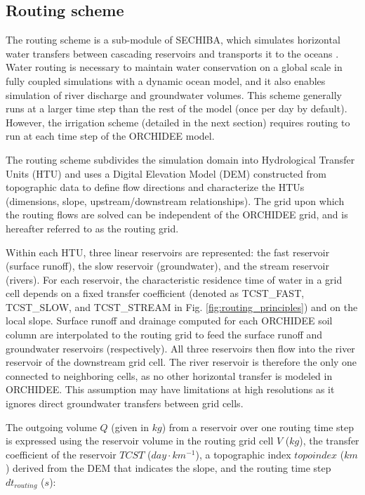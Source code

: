 
\subsection{Routing scheme}
The routing scheme is a sub-module of SECHIBA, which simulates horizontal water transfers between cascading reservoirs and transports it to the oceans \citep{ducharne_development_2003, ngo-duc_validation_2007}. 
Water routing is necessary to maintain water conservation on a global scale in fully coupled simulations with a dynamic ocean model, and it also enables simulation of river discharge and groundwater volumes. 
This scheme generally runs at a larger time step than the rest of the model (once per day by default). However, the irrigation scheme (detailed in the next section) requires routing to run at each time step of the ORCHIDEE model.

The routing scheme subdivides the simulation domain into Hydrological Transfer Units (HTU) and uses a Digital Elevation Model (DEM) constructed from topographic data to define flow directions and characterize the HTUs (dimensions, slope, upstream/downstream relationships). The grid upon which the routing flows are solved can be independent of the ORCHIDEE grid, and is hereafter referred to as the routing grid.

Within each HTU, three linear reservoirs are represented: the fast reservoir (surface runoff), the slow reservoir (groundwater), and the stream reservoir (rivers). For each reservoir, the characteristic residence time of water in a grid cell depends on a fixed transfer coefficient (denoted as TCST\_FAST, TCST\_SLOW, and TCST\_STREAM in Fig. \ref{fig:routing_principles}) and on the local slope.
Surface runoff and drainage computed for each ORCHIDEE soil column are interpolated to the routing grid to feed the surface runoff and groundwater reservoirs (respectively). All three reservoirs then flow into the river reservoir of the downstream grid cell. The river reservoir is therefore the only one connected to neighboring cells, as no other horizontal transfer is modeled in ORCHIDEE. This assumption may have limitations at high resolutions as it ignores direct groundwater transfers between grid cells.

The outgoing volume $Q$ (given in $kg$) from a reservoir over one routing time step is expressed using the reservoir volume in the routing grid cell $V$ ($kg$), the transfer coefficient of the reservoir $TCST$ ($day \cdot km^{-1}$), a topographic index $topoindex$ ($km$) derived from the DEM that indicates the slope, and the routing time step $dt_{routing}$ ($s$):

